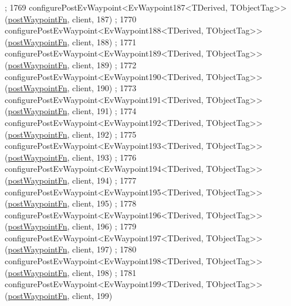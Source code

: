 \begin{DoxyCode}
      ;
1769     configurePostEvWaypoint<EvWaypoint187<TDerived, TObjectTag>>(\hyperlink{classcl__move__base__z_1_1WaypointEventDispatcher_a964a57fcce5d48ec60243230722d8dd7}{postWaypointFn}, client, 187)
      ;
1770     configurePostEvWaypoint<EvWaypoint188<TDerived, TObjectTag>>(\hyperlink{classcl__move__base__z_1_1WaypointEventDispatcher_a964a57fcce5d48ec60243230722d8dd7}{postWaypointFn}, client, 188)
      ;
1771     configurePostEvWaypoint<EvWaypoint189<TDerived, TObjectTag>>(\hyperlink{classcl__move__base__z_1_1WaypointEventDispatcher_a964a57fcce5d48ec60243230722d8dd7}{postWaypointFn}, client, 189)
      ;
1772     configurePostEvWaypoint<EvWaypoint190<TDerived, TObjectTag>>(\hyperlink{classcl__move__base__z_1_1WaypointEventDispatcher_a964a57fcce5d48ec60243230722d8dd7}{postWaypointFn}, client, 190)
      ;
1773     configurePostEvWaypoint<EvWaypoint191<TDerived, TObjectTag>>(\hyperlink{classcl__move__base__z_1_1WaypointEventDispatcher_a964a57fcce5d48ec60243230722d8dd7}{postWaypointFn}, client, 191)
      ;
1774     configurePostEvWaypoint<EvWaypoint192<TDerived, TObjectTag>>(\hyperlink{classcl__move__base__z_1_1WaypointEventDispatcher_a964a57fcce5d48ec60243230722d8dd7}{postWaypointFn}, client, 192)
      ;
1775     configurePostEvWaypoint<EvWaypoint193<TDerived, TObjectTag>>(\hyperlink{classcl__move__base__z_1_1WaypointEventDispatcher_a964a57fcce5d48ec60243230722d8dd7}{postWaypointFn}, client, 193)
      ;
1776     configurePostEvWaypoint<EvWaypoint194<TDerived, TObjectTag>>(\hyperlink{classcl__move__base__z_1_1WaypointEventDispatcher_a964a57fcce5d48ec60243230722d8dd7}{postWaypointFn}, client, 194)
      ;
1777     configurePostEvWaypoint<EvWaypoint195<TDerived, TObjectTag>>(\hyperlink{classcl__move__base__z_1_1WaypointEventDispatcher_a964a57fcce5d48ec60243230722d8dd7}{postWaypointFn}, client, 195)
      ;
1778     configurePostEvWaypoint<EvWaypoint196<TDerived, TObjectTag>>(\hyperlink{classcl__move__base__z_1_1WaypointEventDispatcher_a964a57fcce5d48ec60243230722d8dd7}{postWaypointFn}, client, 196)
      ;
1779     configurePostEvWaypoint<EvWaypoint197<TDerived, TObjectTag>>(\hyperlink{classcl__move__base__z_1_1WaypointEventDispatcher_a964a57fcce5d48ec60243230722d8dd7}{postWaypointFn}, client, 197)
      ;
1780     configurePostEvWaypoint<EvWaypoint198<TDerived, TObjectTag>>(\hyperlink{classcl__move__base__z_1_1WaypointEventDispatcher_a964a57fcce5d48ec60243230722d8dd7}{postWaypointFn}, client, 198)
      ;
1781     configurePostEvWaypoint<EvWaypoint199<TDerived, TObjectTag>>(\hyperlink{classcl__move__base__z_1_1WaypointEventDispatcher_a964a57fcce5d48ec60243230722d8dd7}{postWaypointFn}, client, 199)

\end{DoxyCode}

